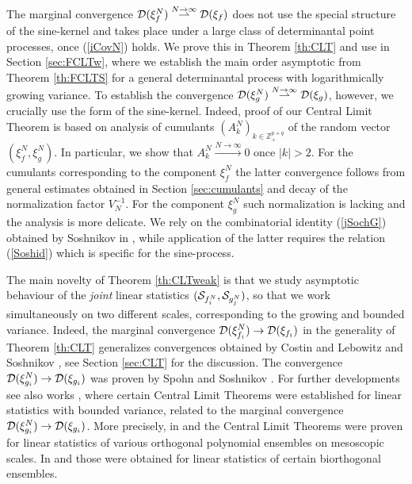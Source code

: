 \documentclass{article}
\numberwithin{equation}{section}
\newcommand{\mZ}{\mathbb{Z}}
\newcommand{\DD}{{\cal D}}
\newcommand{\SSS}{{\cal S}}
\newcommand{\ra}{\rightarrow}
\newcommand{\raw}{\rightharpoonup}
\newcommand{\rtheo}{Theorem \nolinebreak}
\newcommand{\rsec}{Section \nolinebreak}
\begin{document}
The marginal convergence
$\DD(\xi^N_f)\overset{N\ra\infty}\raw\DD(\xi_f)$
does not use the special structure of the sine-kernel and takes place
under a large class of determinantal point processes,
once (\ref{iCovN}) holds.
We prove this in \rtheo\ref{th:CLT}
and use in \rsec\ref{sec:FCLTw},
where we establish the main order asymptotic from \rtheo\ref{th:FCLTS}
for a general determinantal process with logarithmically growing variance.
To establish the convergence
$\DD(\xi^N_g)\overset{N\ra\infty}\raw\DD(\xi_g)$,
however,
we crucially use the form of the sine-kernel.
Indeed, proof of our Central Limit Theorem is based on analysis of
cumulants $(A_k^N)_{k\in\mZ_+^{p+q}}$ of the random vector $(\xi^N_f,\xi^N_g)$.
In particular, we
show that $A_k^N\overset{N\ra\infty}\ra 0$
once $|k|>2$.
For the cumulants corresponding to the component $\xi^N_f$
the latter convergence follows from general estimates obtained in \rsec\ref{sec:cumulants}
and decay of the normalization factor $V_N^{-1}$.
For the component $\xi^N_g$ such normalization is lacking
and the analysis is more delicate.
We rely  on the combinatorial identity (\ref{jSochG}) obtained by Soshnikov in \cite{So00b},
while application of the latter requires the relation (\ref{Soshid})
which is specific for the sine-process.

The main novelty of  \rtheo \ref{th:CLTweak}
is that we study asymptotic behaviour of the \emph{joint}
linear statistics $(\SSS_{f_i^N},\SSS_{g_j^N})$,
so that we work simultaneously on two different scales,
corresponding to the growing and bounded variance.
Indeed, the marginal convergence $\DD(\xi^N_{f_i})\ra \DD(\xi_{f_i})$
in the generality of \rtheo\ref{th:CLT}
generalizes convergences obtained by
Costin and Lebowitz \cite{CL} and Soshnikov \cite{So00,SoAB,So01},
see \rsec\ref{sec:CLT} for the discussion.
The convergence
$\DD(\xi^N_{g_i})\ra \DD(\xi_{g_i})$
was proven by Spohn \cite{Sp} and Soshnikov
\cite{So00b,So01}.
For further developments see also works \cite{JL,L15,L15a,BD16,BD17},
where certain Central Limit Theorems were established  for linear
  statistics with bounded variance, related to the marginal convergence
$\DD(\xi^N_{g_i})\ra \DD(\xi_{g_i})$.
More precisely, in \cite{JL,L15} and \cite{BD16} the Central Limit Theorems were proven for linear statistics of various orthogonal polynomial ensembles on mesoscopic scales.
In \cite{L15a} and \cite{BD17} those were obtained for linear statistics of certain biorthogonal ensembles. 
\end{document}
